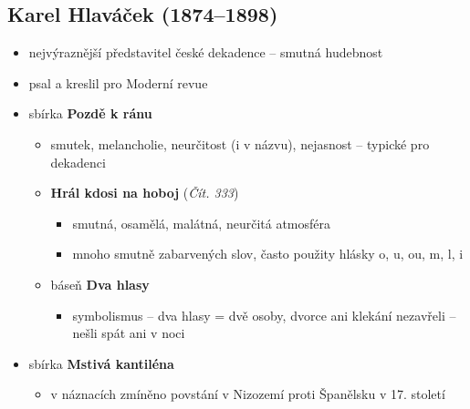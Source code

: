 \subsection{Karel Hlaváček (1874--1898)}
\begin{itemize}
\item nejvýraznější představitel české dekadence -- smutná hudebnost
\item psal a kreslil pro Moderní revue
\item sbírka \textbf{Pozdě k ránu}
	\begin{itemize}
	\item smutek, melancholie, neurčitost (i v názvu), nejasnost -- typické pro dekadenci
	\item \textbf{Hrál kdosi na hoboj} (\textit{Čít. 333})
		\begin{itemize}
		\item smutná, osamělá, malátná, neurčitá atmosféra
		\item mnoho smutně zabarvených slov, často použity hlásky o, u, ou, m, l, i
		\end{itemize}
	\item báseň \textbf{Dva hlasy}
		\begin{itemize}
		\item symbolismus – dva hlasy = dvě osoby, dvorce ani klekání nezavřeli – nešli spát ani v noci
		\end{itemize}
	\end{itemize}
\item sbírka \textbf{Mstivá kantiléna}
	\begin{itemize}
	\item v náznacích zmíněno povstání v Nizozemí proti Španělsku v 17. století
	\end{itemize}
\end{itemize}

